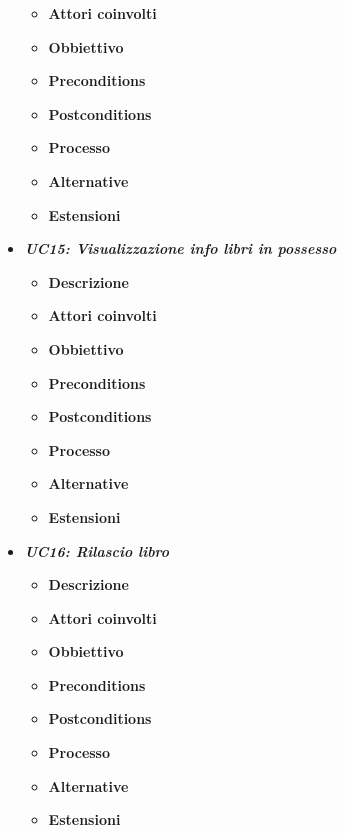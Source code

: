 \begin{itemize}
\begin{itemize}
		\item \textbf{Attori coinvolti}
		\item \textbf{Obbiettivo}
		\item \textbf{Preconditions}
		\item \textbf{Postconditions}
		\item \textbf{Processo}
		\item \textbf{Alternative}
		\item \textbf{Estensioni}
	\end{itemize}
	\item \textbf{\textit{UC15: Visualizzazione info libri in possesso}}
	\begin{itemize}
		\item \textbf{Descrizione}
		\item \textbf{Attori coinvolti}
		\item \textbf{Obbiettivo}
		\item \textbf{Preconditions}
		\item \textbf{Postconditions}
		\item \textbf{Processo}
		\item \textbf{Alternative}
		\item \textbf{Estensioni}
	\end{itemize}
	\item \textbf{\textit{UC16: Rilascio libro}}
	\begin{itemize}
		\item \textbf{Descrizione}
		\item \textbf{Attori coinvolti}
		\item \textbf{Obbiettivo}
		\item \textbf{Preconditions}
		\item \textbf{Postconditions}
		\item \textbf{Processo}
		\item \textbf{Alternative}
		\item \textbf{Estensioni}
	\end{itemize}
\end{itemize}